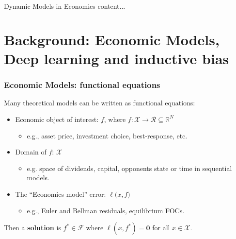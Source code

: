 \documentclass[aspectratio=169,10pt]{beamer}
\newcommand{\emphcolor}[1]{\textbf{\textcolor{emphcolorval}{#1}}}
\newcommand{\Xdom}{\mathcal{X}}
\newcommand{\F}{\mathcal{F}}
\begin{document}
\begin{frame}{Dynamic Models in Economics}
	content...
\end{frame}
	
\section{\textcolor{PennBlue}{Background: Economic Models, Deep learning and inductive bias}}


\begin{frame}
	\frametitle{Economic Models: functional equations}
	Many theoretical models can be written as functional equations:
	\begin{itemize}
		\item Economic object of interest: $f $, where $f : \Xdom\to \mathcal{R}\subseteq \mathbb{R}^N$ 
		\begin{itemize}
			\item e.g., asset price, investment choice, best-response, etc.
		\end{itemize}
			\vspace{0.1in}
		\item Domain of $f$: $\Xdom$  
		\begin{itemize}
			\item e.g. space of dividends, capital, opponents state or time in sequential models.
		\end{itemize}
			\vspace{0.1in}
		\item The ``Economics model'' error:  $\ell \big(x,f\big)$  
		\begin{itemize}
			\item e.g., Euler and Bellman residuals, equilibrium FOCs.
		\end{itemize}
		\vspace{0.1in}
	\end{itemize}
	Then a \emphcolor{solution} is $f^*\in \F$ where $\ell(x,f^*) = \mathbf{0}$ for all $x \in \Xdom$.\vspace{0.1in}
\end{frame}
\end{document}
